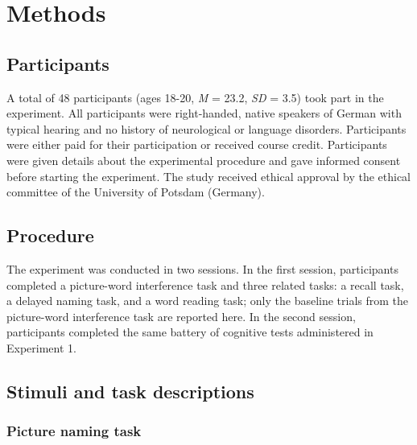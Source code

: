 \documentclass[
  man,floatsintext]{apa6}
\begin{document}
\hypertarget{methods-1}{%
\section{Methods}\label{methods-1}}

\hypertarget{participants-1}{%
\subsection{Participants}\label{participants-1}}

A total of 48 participants (ages 18-20, \emph{M} = 23.2, \emph{SD} = 3.5) took part in the experiment. All participants were right-handed, native speakers of German with typical hearing and no history of neurological or language disorders. Participants were either paid for their participation or received course credit. Participants were given details about the experimental procedure and gave informed consent before starting the experiment. The study received ethical approval by the ethical committee of the University of Potsdam (Germany).

\hypertarget{procedure-1}{%
\subsection{Procedure}\label{procedure-1}}

The experiment was conducted in two sessions. In the first session, participants completed a picture-word interference task and three related tasks: a recall task, a delayed naming task, and a word reading task; only the baseline trials from the picture-word interference task are reported here. In the second session, participants completed the same battery of cognitive tests administered in Experiment 1.

\hypertarget{stimuli-and-task-descriptions-1}{%
\subsection{Stimuli and task descriptions}\label{stimuli-and-task-descriptions-1}}

\hypertarget{picture-naming-task-1}{%
\subsubsection{Picture naming task}\label{picture-naming-task-1}}
\end{document}
